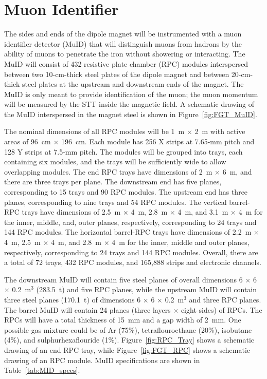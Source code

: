 \section{Muon Identifier}
\label{sec:nd-nnd-muid}

The sides and ends of the dipole magnet will be instrumented
with a muon identifier
detector (MuID) that will distinguish muons from hadrons by the ability 
of muons to penetrate the iron without showering or interacting.
The MuID will consist of 432 resistive plate chamber (RPC) modules
interspersed between two 10-cm-thick steel plates of the 
dipole magnet and between 20-cm-thick steel plates at the upstream and
downstream ends of the magnet. 
The MuID is only meant to provide %
identification of the 
muon; the muon momentum %
will be measured by the STT inside the 
magnetic field. A schematic drawing of the MuID 
interspersed in the magnet steel is shown in Figure~\ref{fig:FGT_MuID}.

The nominal dimensions of all RPC modules will be 1~m $\times$ 2~m with
active areas of 96~cm $\times$ 196~cm. Each
module has 256 X strips
at 7.65-mm pitch and 128 Y strips at 7.5-mm pitch. The modules
will be grouped into trays, each containing six modules, and the trays will
be sufficiently wide to allow overlapping modules. 
The end RPC trays have dimensions of 2~m $\times$ 6~m, and there are three trays per plane.
The downstream end has five planes, corresponding to 15 trays and 90 RPC modules.
The upstream end has three planes, corresponding to nine trays and 54 RPC modules.
The vertical barrel-RPC trays have dimensions of 2.5~m $\times$ 4~m, 2.8~m $\times$ 4~m, and
3.1~m $\times$ 4~m for the inner, middle, and, outer planes, respectively, corresponding
to 24 trays and 144 RPC modules. The horizontal
barrel-RPC trays have dimensions of 2.2~m $\times$ 4~m, 2.5~m $\times$ 4~m, and
2.8~m $\times$ 4~m for the inner, middle and outer planes, respectively, 
corresponding to 24 trays and 144 RPC modules. Overall, there are a total of
72 trays, 432 RPC modules, and 165,888 strips and electronic channels. 

The downstream MuID will contain five steel planes of 
overall dimensions
6 $\times$ 6 $\times$ 0.2~m$^3$ (283.5~t)
and five RPC planes, while the upstream MuID will contain three steel
planes (170.1~t) of dimensions 6 $\times$ 6 $\times$ 0.2~m$^3$ and three RPC planes. The barrel MuID will contain
24 planes (three layers $\times$ eight sides) of RPCs. The RPCs will have a total thickness 
of 15~mm and a gap width of 2~mm. One possible gas mixture could be %
of Ar (75\%), tetraflouroethane (20\%), isobutane (4\%),
and sulphurhexaflouride (1\%). 
Figure~\ref{fig:RPC_Tray} shows a schematic drawing of an end RPC tray,
while Figure~\ref{fig:FGT_RPC} shows a schematic drawing of an RPC module.
MuID specifications are shown in Table~\ref{tab:MID_specs}.

